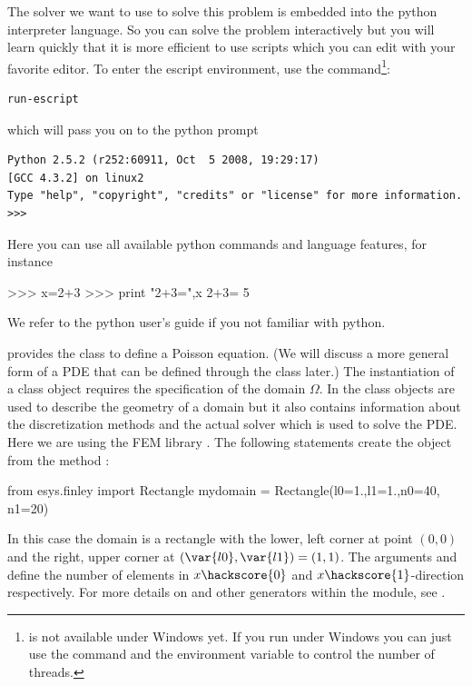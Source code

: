 The \escript solver we want to use to solve this problem is embedded into the python interpreter language.
So you can solve the problem interactively but you will learn quickly that it
is more efficient to use scripts which you can edit with your favorite editor.
To enter the escript environment, use the 
command\footnote{ is not available under Windows yet.
If you run under Windows you can just use the  command and the
 environment variable to control the number of threads.}:
\begin{verbatim}
run-escript
\end{verbatim}
which will pass you on to the python prompt
\begin{verbatim}
Python 2.5.2 (r252:60911, Oct  5 2008, 19:29:17) 
[GCC 4.3.2] on linux2
Type "help", "copyright", "credits" or "license" for more information.
>>> 
\end{verbatim}
Here you can use all available python commands and language features, for instance
\begin{python}
  >>> x=2+3
  >>> print "2+3=",x
  2+3= 5
\end{python}
We refer to the python user's guide if you not familiar with python.

\escript provides the class \Poisson to define a Poisson equation.
(We will discuss a more general form of a PDE 
that can be defined through the \LinearPDE class later.)
The instantiation of a \Poisson class object requires the specification of the domain $\Omega$.
In \escript the \Domain class objects are used to describe the geometry of a
domain but it also contains information about the discretization methods and
the actual solver which is used to solve the PDE.
Here we are using the FEM library \finley{}.
The following statements create the \Domain object  from the 
\finley method :
\begin{python}
  from esys.finley import Rectangle
  mydomain = Rectangle(l0=1.,l1=1.,n0=40, n1=20)
\end{python}
In this case the domain is a rectangle with the lower, left corner at point $(0,0)$ and
the right, upper corner at $(\var{l0},\var{l1})=(1,1)$.
The arguments  and  define the number of elements in $x\hackscore{0}$ and
$x\hackscore{1}$-direction respectively. For more details on  and
other \Domain generators within the \finley module,
see .

